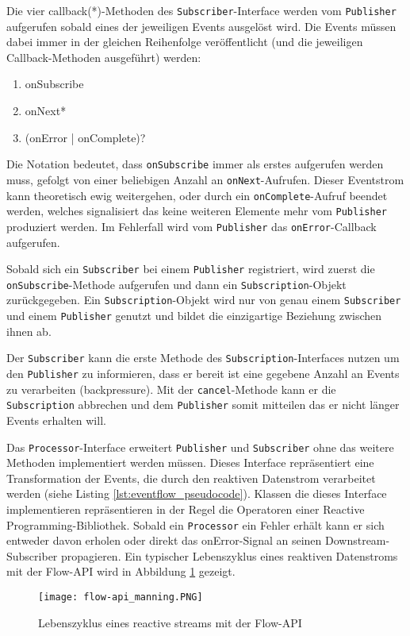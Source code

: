 Die vier \gls{callback}(*)-Methoden des \verb|Subscriber|-Interface werden vom \verb|Publisher| aufgerufen sobald eines der jeweiligen Events ausgelöst wird.
Die Events müssen dabei immer in der gleichen Reihenfolge veröffentlicht (und die jeweiligen Callback-Methoden ausgeführt) werden:
\begin{enumerate}
  \item onSubscribe
  \item onNext*
  \item (onError | onComplete)?
\end{enumerate}
Die Notation bedeutet, dass \verb|onSubscribe| immer als erstes aufgerufen werden muss, gefolgt von einer beliebigen Anzahl an
\verb|onNext|-Aufrufen. Dieser Eventstrom kann theoretisch ewig weitergehen, oder durch ein \verb|onComplete|-Aufruf beendet werden, welches
signalisiert das keine weiteren Elemente mehr vom \verb|Publisher| produziert werden.
Im Fehlerfall wird vom \verb|Publisher| das \verb|onError|-Callback aufgerufen.

Sobald sich ein \verb|Subscriber| bei einem \verb|Publisher| registriert, wird zuerst die \verb|onSubscribe|-Methode aufgerufen und dann ein
\verb|Subscription|-Objekt zurückgegeben. Ein \verb|Subscription|-Objekt wird nur von genau einem \verb|Subscriber| und einem \verb|Publisher| genutzt
und bildet die einzigartige Beziehung zwischen ihnen ab.

Der \verb|Subscriber| kann die erste Methode des \verb|Subscription|-Interfaces nutzen um den \verb|Publisher| zu informieren, dass er bereit
ist eine gegebene Anzahl an Events zu verarbeiten (backpressure). Mit der \verb|cancel|-Methode kann er die \verb|Subscription| abbrechen und dem \verb|Publisher|
somit mitteilen das er nicht länger Events erhalten will.
\parencite{JavaSEFlow}

Das \verb|Processor|-Interface erweitert \verb|Publisher| und \verb|Subscriber| ohne das weitere Methoden implementiert werden müssen.
Dieses Interface repräsentiert eine Transformation der Events, die durch den
reaktiven Datenstrom verarbeitet werden (siehe Listing \ref{lst:eventflow_pseudocode}).
Klassen die dieses Interface implementieren repräsentieren in der Regel die Operatoren einer Reactive Programming-Bibliothek.
Sobald ein \verb|Processor| ein Fehler erhält kann er sich entweder davon erholen oder direkt das onError-Signal an seinen
Downstream-Subscriber propagieren. Ein typischer Lebenszyklus eines reaktiven Datenstroms mit der Flow-API wird in
Abbildung \ref{fig:flow-api} gezeigt.
\begin{figure}[ht!]
  \centering
  \texttt{[image: flow-api\_manning.PNG]}
  \caption{Lebenszyklus eines reactive streams mit der Flow-API \parencite[Kapitel 17,  Figure 17.3]{JavaInAction}}
  \label{fig:flow-api}
\end{figure}
\newpage

